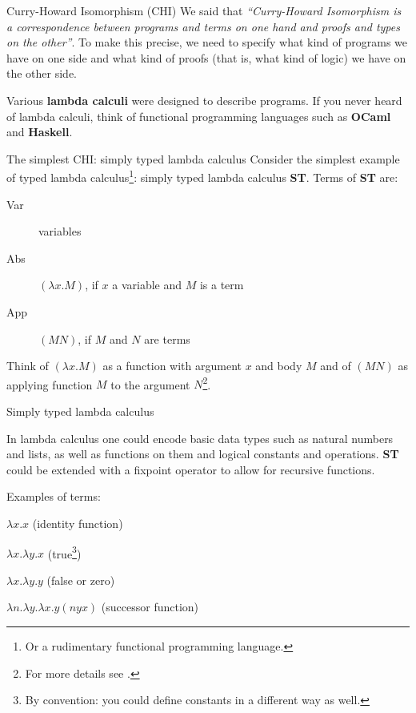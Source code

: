 \documentclass[10pt]{beamer}
\begin{document}
   \begin{frame}{Curry-Howard Isomorphism (CHI)}
     We said that {\it ``Curry-Howard Isomorphism is a correspondence between programs and terms on one hand and proofs and types on the other''}. To make this precise, we need to specify what kind of programs we have on one side and what kind of proofs (that is, what kind of logic) we have on the other side.

     Various {\bf lambda calculi} were designed to describe programs.%
     If you never heard of lambda calculi, think of functional programming languages such as {\bf OCaml} and {\bf Haskell}.
     
\end{frame}
\begin{frame}{The simplest CHI: simply typed lambda calculus}
    Consider the simplest example of typed lambda calculus\footnote{Or a rudimentary functional programming language.}: simply typed lambda calculus {\bf ST}. Terms of {\bf ST} are:
     \begin{description}
     \item[Var] variables
     \item[Abs] $(\lambda x.M)$, if $x$ a variable and $M$ is a term 
     \item[App] $(M N)$, if $M$ and $N$ are terms
     \end{description}
     Think of $(\lambda x.M)$ as a function with argument $x$ and body $M$ and of $(M N)$ as applying function $M$ to the argument $N$\footnote{For more details see \cite{Sørensen98lectureson}.}. %

\end{frame}
\begin{frame}{Simply typed lambda calculus}
       
     In lambda calculus one could encode basic data types such as natural numbers and lists, as well as functions on them and logical constants and operations. {\bf ST} could be extended with a fixpoint operator to allow for recursive functions.

     Examples of terms:

     $\lambda x.x$ (identity function)
     
     $\lambda x.\lambda y. x$ (true\footnote{By convention: you could define constants in a different way as well.})

     $\lambda x.\lambda y. y$ (false or zero)

     $\lambda n. \lambda y. \lambda x. y (n y x)$ (successor function)
\end{frame}
\end{document}
